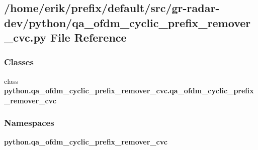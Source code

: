 \subsection{/home/erik/prefix/default/src/gr-\/radar-\/dev/python/qa\+\_\+ofdm\+\_\+cyclic\+\_\+prefix\+\_\+remover\+\_\+cvc.py File Reference}
\label{qa__ofdm__cyclic__prefix__remover__cvc_8py}
\subsubsection*{Classes}
\begin{DoxyCompactItemize}
\item 
class {\bf python.\+qa\+\_\+ofdm\+\_\+cyclic\+\_\+prefix\+\_\+remover\+\_\+cvc.\+qa\+\_\+ofdm\+\_\+cyclic\+\_\+prefix\+\_\+remover\+\_\+cvc}
\end{DoxyCompactItemize}
\subsubsection*{Namespaces}
\begin{DoxyCompactItemize}
\item 
 {\bf python.\+qa\+\_\+ofdm\+\_\+cyclic\+\_\+prefix\+\_\+remover\+\_\+cvc}
\end{DoxyCompactItemize}
